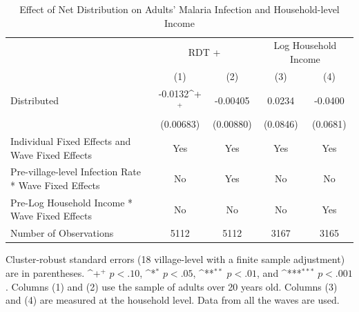 \documentclass[fleqn,11pt]{article}
\newcommand{\sym}[1]{\rlap{$#1$}}
\def\sym#1{\ifmmode^{#1}\else\(^{#1}\)\fi
}
\begin{document}
\begin{table}[h]
\caption{Effect of Net Distribution on Adults' Malaria Infection and Household-level Income}
\label{adultrdt}
\centering
\begin{threeparttable}
\begin{tabular}{l*{4}{c}}
\hline\hline

                    &\multicolumn{2}{c}{RDT +}&\multicolumn{2}{c}{Log Household Income}\\ \cmidrule(lr){2-3} \cmidrule(lr){4-5}
                                        &\multicolumn{1}{c}{(1)}&\multicolumn{1}{c}{(2)}&\multicolumn{1}{c}{(3)}&\multicolumn{1}{c}{(4)}\\
\hline
Distributed         &     -0.0132\sym{+}  &    -0.00405         &      0.0234         &     -0.0400         \\
                    &   (0.00683)         &   (0.00880)         &    (0.0846)         &    (0.0681)         \\

Individual Fixed Effects and Wave Fixed Effects &         Yes         &         Yes         &         Yes         &         Yes         \\

Pre-village-level Infection Rate * Wave Fixed Effects&          No         &         Yes         &          No         &          No         \\

Pre-Log Household Income * Wave Fixed Effects&          No         &          No         &          No         &         Yes         \\
\hline
Number of Observations        &        5112         &        5112         &        3167         &        3165         \\
\hline\hline
\end{tabular}
\begin{tablenotes}
\item Cluster-robust standard errors (18 village-level with a finite sample adjustment) are in parentheses. \sym{+} \(p<.10\), \sym{*} \(p<.05\), \sym{**} \(p<.01\), and \sym{***} \(p<.001\). Columns (1) and (2) use the sample of adults over 20 years old. Columns (3) and (4) are measured at the household level. Data from all the waves are used. 
\end{tablenotes}
\end{threeparttable}
\end{table}
\end{document}

